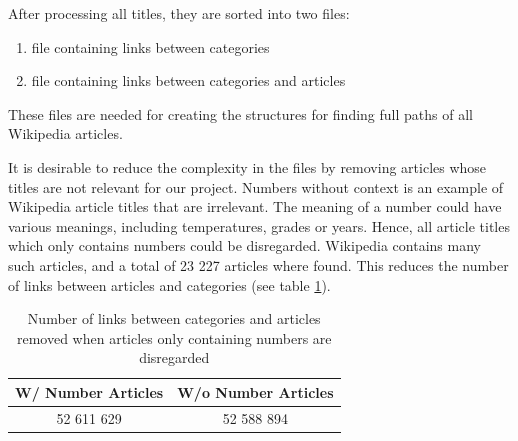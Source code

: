 After processing all titles, they are sorted into two files: 
\begin{enumerate}
\item file containing links between categories
\item file containing links between categories and articles
\end{enumerate}
These files are needed for creating the structures for finding full paths of all Wikipedia articles. 


It is desirable to reduce the complexity in the files by removing articles whose titles are not relevant for our project. Numbers without context is an example of Wikipedia article titles that are irrelevant. The meaning of a number could have various meanings, including temperatures, grades or years. Hence, all article titles which only contains numbers could be disregarded. Wikipedia contains many such articles, and a total of 23 227 articles where found. This reduces the number of links between articles and categories (see table  \ref{tab:withoutnumber}).

\begin{table}[h]
\centering
\renewcommand{\arraystretch}{1.25}
\begin{tabular}{c|c}
\textbf{W/ Number Articles} & \textbf{W/o Number Articles}  \\ \hline
52 611 629 & 52 588 894
\end{tabular}
\\[10pt]
\caption[Number of links without number articles]{Number of links between categories and articles removed when articles only containing numbers are disregarded}
\label{tab:withoutnumber}
\end{table}


